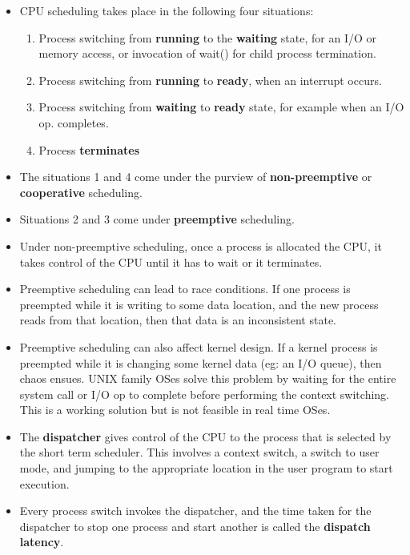 \documentclass{article}
\theoremstyle{plain}
\theoremstyle{definition}
\begin{document}
\begin{itemize}
    \item CPU scheduling takes place in the following four situations:
    \begin{enumerate}
        \item Process switching from \textbf{running} to the \textbf{waiting} state, for an I/O or memory access, or invocation of wait() for child process termination. 
        
        \item Process switching from \textbf{running} to \textbf{ready}, when an interrupt occurs.
        
        \item Process switching from \textbf{waiting} to \textbf{ready} state, for example when an I/O op. completes.
        
        \item Process \textbf{terminates}
    \end{enumerate}
    
    \item The situations 1 and 4 come under the purview of \textbf{non-preemptive} or \textbf{cooperative} scheduling. 
    
    \item Situations 2 and 3 come under \textbf{preemptive} scheduling. 
    
    \item Under non-preemptive scheduling, once a process is allocated the CPU, it takes control of the CPU until it has to wait or it terminates. 
    
    \item Preemptive scheduling can lead to race conditions. If one process is preempted while it is writing to some data location, and the new process reads from that location, then that data is an inconsistent state. 
    
    \item Preemptive scheduling can also affect kernel design. If a kernel process is preempted while it is changing some kernel data (eg: an I/O queue), then chaos ensues. UNIX family OSes solve this problem by waiting for the entire system call or I/O op to complete before performing the context switching. This is a working solution but is not feasible in real time OSes. 
    
    \item The \textbf{dispatcher} gives control of the CPU to the process that is selected by the short term scheduler. This involves a context switch, a switch to user mode, and jumping to the appropriate location in the user program to start execution. 
    
    \item Every process switch invokes the dispatcher, and the time taken for the dispatcher to stop one process and start another is called the \textbf{dispatch latency}.
\end{itemize}
\end{document}
